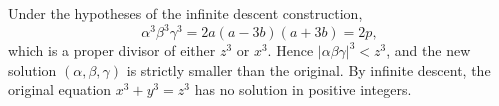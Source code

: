 Under the hypotheses of the infinite descent construction,
$$\alpha^3 \beta^3 \gamma^3 = 2a(a - 3b)(a + 3b) = 2p,$$
which is a proper divisor of either $z^3$ or $x^3$. Hence $|\alpha\beta\gamma|^3 < z^3$, and the new solution $(\alpha, \beta, \gamma)$ is strictly smaller than the original. By infinite descent, the original equation $x^3 + y^3 = z^3$ has no solution in positive integers.
